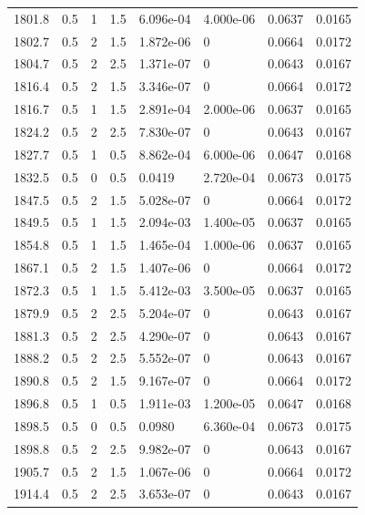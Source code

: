 \documentclass[preview]{standalone}
\begin{document}
{{{{\begin{tabular}{L{1.2cm}C{1.2cm} C{0.3cm}C{0.5cm} C{1.4cm}C{1.4cm} C{1.4cm}C{1.4cm}}
  1801.8  &   0.5  & 1     & 1.5 &  6.096e-04  & 4.000e-06  & 0.0637 &  0.0165   \\ 
  1802.7  &   0.5  & 2     & 1.5 &  1.872e-06  & 0  & 0.0664 &  0.0172   \\ 
  1804.7  &   0.5  & 2     & 2.5 &  1.371e-07  & 0  & 0.0643 &  0.0167   \\ 
  1816.4  &   0.5  & 2     & 1.5 &  3.346e-07  & 0  & 0.0664 &  0.0172   \\ 
  1816.7  &   0.5  & 1     & 1.5 &  2.891e-04  & 2.000e-06  & 0.0637 &  0.0165   \\ 
  1824.2  &   0.5  & 2     & 2.5 &  7.830e-07  & 0  & 0.0643 &  0.0167   \\ 
  1827.7  &   0.5  & 1     & 0.5 &  8.862e-04  & 6.000e-06  & 0.0647 &  0.0168   \\ 
  1832.5  &   0.5  & 0     & 0.5 &  0.0419  & 2.720e-04  & 0.0673 &  0.0175   \\ 
  1847.5  &   0.5  & 2     & 1.5 &  5.028e-07  & 0  & 0.0664 &  0.0172   \\ 
  1849.5  &   0.5  & 1     & 1.5 &  2.094e-03  & 1.400e-05  & 0.0637 &  0.0165   \\ 
  1854.8  &   0.5  & 1     & 1.5 &  1.465e-04  & 1.000e-06  & 0.0637 &  0.0165   \\ 
  1867.1  &   0.5  & 2     & 1.5 &  1.407e-06  & 0  & 0.0664 &  0.0172   \\ 
  1872.3  &   0.5  & 1     & 1.5 &  5.412e-03  & 3.500e-05  & 0.0637 &  0.0165   \\ 
  1879.9  &   0.5  & 2     & 2.5 &  5.204e-07  & 0  & 0.0643 &  0.0167   \\ 
  1881.3  &   0.5  & 2     & 2.5 &  4.290e-07  & 0  & 0.0643 &  0.0167   \\ 
  1888.2  &   0.5  & 2     & 2.5 &  5.552e-07  & 0  & 0.0643 &  0.0167   \\ 
  1890.8  &   0.5  & 2     & 1.5 &  9.167e-07  & 0  & 0.0664 &  0.0172   \\ 
  1896.8  &   0.5  & 1     & 0.5 &  1.911e-03  & 1.200e-05  & 0.0647 &  0.0168   \\ 
  1898.5  &   0.5  & 0     & 0.5 &  0.0980  & 6.360e-04  & 0.0673 &  0.0175   \\ 
  1898.8  &   0.5  & 2     & 2.5 &  9.982e-07  & 0  & 0.0643 &  0.0167   \\ 
  1905.7  &   0.5  & 2     & 1.5 &  1.067e-06  & 0  & 0.0664 &  0.0172   \\ 
  1914.4  &   0.5  & 2     & 2.5 &  3.653e-07  & 0  & 0.0643 &  0.0167   \\ 

\end{tabular}}}}}
\end{document}
